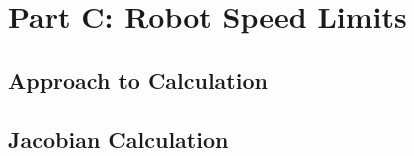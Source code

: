 \section{Part C: Robot Speed Limits}
\subsection{Approach to Calculation}
\subsection{Jacobian Calculation}

